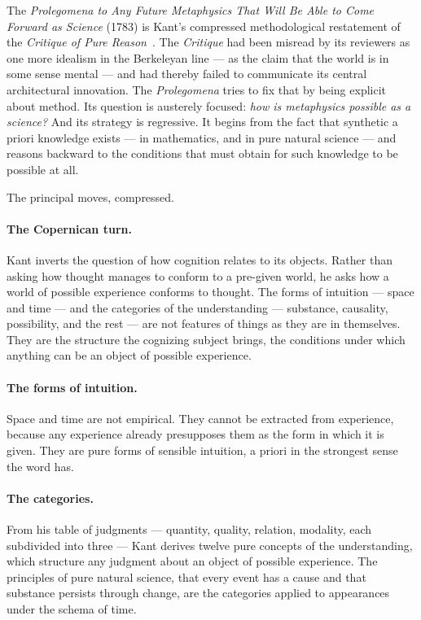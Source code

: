 The \emph{Prolegomena to Any Future Metaphysics That Will Be Able
to Come Forward as Science} (1783) is Kant's compressed
methodological restatement of the \emph{Critique of Pure
Reason}~\cite{Kant1783,Kant1781}.
The \emph{Critique} had been misread by its reviewers as one more
idealism in the Berkeleyan line --- as the claim that the world is
in some sense mental --- and had thereby failed to communicate its
central architectural innovation.
The \emph{Prolegomena} tries to fix that by being explicit about
method.
Its question is austerely focused: \emph{how is metaphysics
possible as a science?}
And its strategy is regressive.
It begins from the fact that synthetic a priori knowledge exists
--- in mathematics, and in pure natural science --- and reasons
backward to the conditions that must obtain for such knowledge to
be possible at all.

The principal moves, compressed.

\paragraph{The Copernican turn.}
Kant inverts the question of how cognition relates to its objects.
Rather than asking how thought manages to conform to a pre-given
world, he asks how a world of possible experience conforms to
thought.
The forms of intuition --- space and time --- and the categories of
the understanding --- substance, causality, possibility, and the
rest --- are not features of things as they are in themselves.
They are the structure the cognizing subject brings, the conditions
under which anything can be an object of possible experience.

\paragraph{The forms of intuition.}
Space and time are not empirical.
They cannot be extracted from experience, because any experience
already presupposes them as the form in which it is given.
They are pure forms of sensible intuition, a priori in the
strongest sense the word has.

\paragraph{The categories.}
From his table of judgments --- quantity, quality, relation,
modality, each subdivided into three --- Kant derives twelve pure
concepts of the understanding, which structure any judgment about
an object of possible experience.
The principles of pure natural science, that every event has a
cause and that substance persists through change, are the
categories applied to appearances under the schema of time.

